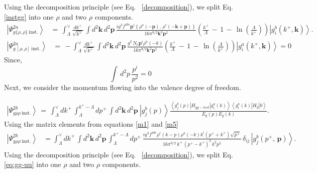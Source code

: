 \documentclass[aps,prd,amsmath,amssymb,nofootinbib]{revtex4-2}
\numberwithin{equation}{section}
\begin{document}
Using the decomposition principle (see Eq.~ \eqref{decomposition}), we split Eq.~ \eqref{instgg} into one $\rho$ and two $\rho$ components.
\begin{align}\label{grho3}
\left|\Psi_{g\{\rho,\rho\}\:\text{inst.}}^{2a}\right\rangle &=\,\int_{\Lambda}^{\vee}\frac{dk^{+}}{\sqrt{k^{+}}}\,\int d^{2}\mathbf{k}\, d^{2}\mathbf{p}\,\frac{ig^{3}f^{abc}\mathbf{p}^{i}\left\{ \rho^{a}(-\mathbf{p}),\,\rho^{c}(-\mathbf{k}+\mathbf{p})\right\} }{16\pi^{9/2}\mathbf{k}^{2}\mathbf{p}^{2}}\left(\frac{k^{+}}{\Lambda}\,-\,1\,-\,\ln\left(\frac{\Lambda}{k^{+}}\right)\right)\left|g_{i}^{b}(k^{+},\mathbf{k})\right\rangle .  
\end{align}
\begin{align}
    \left|\Psi_{g\,[\rho,\rho]\:\text{inst.}}^{2a}\right\rangle &=\,-\int_{\Lambda}^{\vee}\frac{dk^{+}}{\sqrt{k^{+}}}\,\int d^{2}\mathbf{k}\, d^{2}\mathbf{p}\,\frac{g^{3}\,N_{c}\mathbf{p}^{i}\rho^{a}(-k)}{16\pi^{9/2}\mathbf{k}^{2}\mathbf{p}^{2}}\left(\frac{k^{+}}{\Lambda}\,-\,1\,-\,\ln\left(\frac{\Lambda}{k^{+}}\right)\right)\left|g_{i}^{a}(k^{+},\mathbf{k})\right\rangle = 0
\end{align}
Since, 
$$\int\, d^{2}p\, \frac{p^{i}}{p^{2}} = 0$$ 
Next, we consider the momentum flowing into the valence degree of freedom.
\begin{figure}[h]
    \label{fig:5}
\end{figure}
\begin{align}\label{gthreeu}
\left|\Psi_{g\rho\rho\:\text{inst.}}^{2b}\right\rangle \,=\,\int_{\Lambda}^{\vee}dk^{+}\,\int_{\Lambda}^{k^{+}-\Lambda}dp^{+}\,\int d^{2}\mathbf{k}\, d^{2}\mathbf{p}\:\left|g_{j}^{b}(p)\right\rangle \frac{\left\langle g_{j}^{b}(p)\left|H_{gg-inst}\right|g_{i}^{a}(k)\right\rangle \left\langle g_{i}^{a}(k)\left|H_{g}\right|0\right\rangle }{E_{g}(p)E_{g}(k)}.
\end{align}
Using the matrix elements from equations \eqref{m1} and  \eqref{m5}
\begin{align}\label{eq:gg-uu}
\left|\Psi_{g\rho\rho\:\text{inst.}}^{2b}\right\rangle & = \int_{\Lambda}^{\vee}dk^{+}\,\int d^{2}\mathbf{k}\, d^{2}\mathbf{p}\,\int_{\Lambda}^{k^{+}-\Lambda} dp^{+}\, \frac{ig^{3}f^{abc}\rho^{c}(k-p)\rho^{a}(-k)k^{i}(p^{+}+k^{+})\sqrt{p^{+}}}{16\pi^{9/2}\, k^{+}\,(p^{+}-k^{+})^{2}\, k^{2}p^{2}}\,\delta_{ij}\,\left|g_{j}^{b}( p^{+},\,\mathbf{p})\right\rangle.
\end{align}
Using the decomposition principle (see Eq.~ \eqref{decomposition}), we split Eq.~ \eqref{eq:gg-uu} into one $\rho$ and two $\rho$ components.
\end{document}
